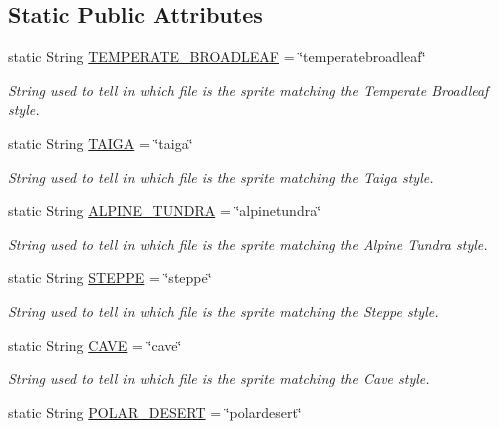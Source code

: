 \subsection*{Static Public Attributes}
\begin{DoxyCompactItemize}
\item 
static String \hyperlink{a00030_a9e9253b684231327dd6ddeca5768033e}{T\-E\-M\-P\-E\-R\-A\-T\-E\-\_\-\-B\-R\-O\-A\-D\-L\-E\-A\-F} = \char`\"{}temperatebroadleaf\char`\"{}
\begin{DoxyCompactList}\small\item\em String used to tell in which file is the sprite matching the Temperate Broadleaf style. \end{DoxyCompactList}\item 
static String \hyperlink{a00028_ad3418d8f4936efb0ef1e3eb2009a34f0}{T\-A\-I\-G\-A} = \char`\"{}taiga\char`\"{}
\begin{DoxyCompactList}\small\item\em String used to tell in which file is the sprite matching the Taiga style. \end{DoxyCompactList}\item 
static String \hyperlink{a00002_ad3c9b18e312ff348661fc1a42f28f7b6}{A\-L\-P\-I\-N\-E\-\_\-\-T\-U\-N\-D\-R\-A} = \char`\"{}alpinetundra\char`\"{}
\begin{DoxyCompactList}\small\item\em String used to tell in which file is the sprite matching the Alpine Tundra style. \end{DoxyCompactList}\item 
static String \hyperlink{a00027_a03bdfdc54a3a5d52694b77342ec34e3e}{S\-T\-E\-P\-P\-E} = \char`\"{}steppe\char`\"{}
\begin{DoxyCompactList}\small\item\em String used to tell in which file is the sprite matching the Steppe style. \end{DoxyCompactList}\item 
static String \hyperlink{a00004_abbad3655c1d1f230dddfd7ecc5194f50}{C\-A\-V\-E} = \char`\"{}cave\char`\"{}
\begin{DoxyCompactList}\small\item\em String used to tell in which file is the sprite matching the Cave style. \end{DoxyCompactList}\item 
static String \hyperlink{a00019_a48dd1801e0146ea2306dadcbdee81b77}{P\-O\-L\-A\-R\-\_\-\-D\-E\-S\-E\-R\-T} = \char`\"{}polardesert\char`\"{}

\end{DoxyCompactItemize}
